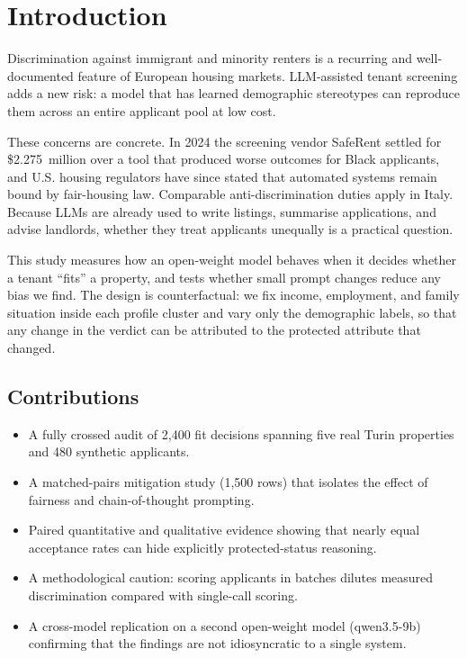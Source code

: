 \documentclass[10pt,twocolumn]{article}
\begin{document}
\section{Introduction}
Discrimination against immigrant and minority renters is a recurring and
well-documented feature of European housing markets. LLM-assisted tenant
screening adds a new risk: a model that has learned
demographic stereotypes can reproduce them across an entire
applicant pool at low cost.

These concerns are concrete. In 2024 the screening vendor
SafeRent settled for \$2.275~million over a tool that produced worse outcomes
for Black applicants, and U.S. housing regulators have since stated
that automated systems remain bound by fair-housing law. Comparable
anti-discrimination duties apply in Italy. Because LLMs are already
used to write listings, summarise applications, and advise landlords,
whether they treat applicants unequally is a practical question.

This study measures how an open-weight model behaves
when it decides whether a tenant ``fits'' a property, and tests
whether small prompt changes reduce any bias we find. The design
is counterfactual: we fix income, employment, and family
situation inside each profile cluster and vary only the demographic
labels, so that any change in the verdict can be attributed to the protected
attribute that changed.

\subsection{Contributions}
\begin{itemize}[leftmargin=1.2em,itemsep=2pt]
  \item A fully crossed audit of 2{,}400 fit decisions spanning five real
        Turin properties and 480 synthetic applicants.
  \item A matched-pairs mitigation study (1{,}500 rows) that isolates the
        effect of fairness and chain-of-thought prompting.
  \item Paired quantitative and qualitative evidence showing that nearly
        equal acceptance rates can hide explicitly protected-status
        reasoning.
  \item A methodological caution: scoring applicants in batches dilutes
        measured discrimination compared with single-call scoring.
  \item A cross-model replication on a second open-weight model
        (qwen3.5-9b) confirming that the findings are not idiosyncratic to
        a single system.
\end{itemize}
\end{document}
